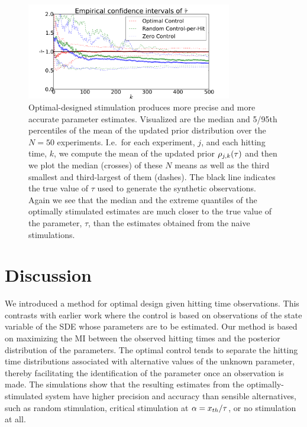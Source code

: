 \documentclass[12pt]{article}
\begin{document}
\begin{figure}[htp]
\begin{center}
  \includegraphics[width=0.8\textwidth]{Figs/HTOnlineEstimator/online_updated_prior_quantiles_mean_per_experiment.pdf}
  \caption[Quantiles of the Mean Estimates]{Optimal-designed stimulation produces more precise and more accurate
  parameter estimates. 
  Visualized are the median and
  5/95th percentiles of the mean of the updated prior
  distribution over the $N=50$ experiments. I.e.\ for each experiment, $j$, and
  each hitting time, $k$, we compute the mean of the updated prior $\rho_{j,k}({ \tau })$
  and then we plot the median (crosses) of these $N$ means as well as the third
  smallest and third-largest of them (dashes). 
  The black line indicates the true value of $\tau$ used to generate the
  synthetic observations. 
  Again we see that the median and the extreme quantiles of the
  optimally stimulated estimates are much closer to the true value of the
  parameter, $\tau$, than the estimates obtained from the naive stimulations.}
  \label{fig:online_optimization_quantiles_belief_evolution}
\end{center}
\end{figure}


\section{Discussion}
\label{sec:discussion}
We introduced a method for optimal design given hitting time observations. This
contrasts with earlier work where the control is based on observations of the
state variable of the SDE whose parameters are to
be estimated. Our method is based on maximizing the MI between
the observed hitting times and the posterior distribution of the parameters. The
optimal control tends to separate the hitting time distributions associated with
alternative values of the unknown parameter, thereby facilitating the
identification of the parameter once an observation is made. The simulations
show that the resulting estimates from the optimally-stimulated system have
higher precision and accuracy than sensible alternatives, such as random
stimulation, critical stimulation at $\alpha={ x_{th} }/{ \tau }$, or no stimulation at
all.
\end{document}
